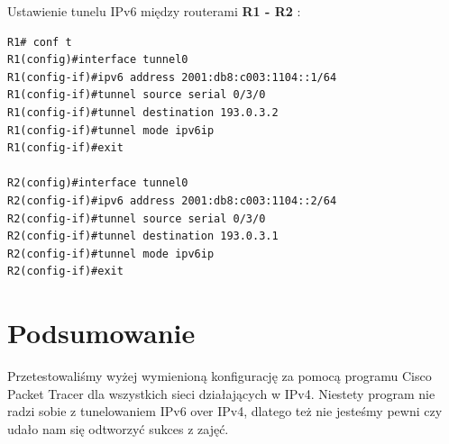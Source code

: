 \documentclass[11pt,a4paper]{article}
\begin{document}
\noindent
Ustawienie tunelu IPv6 między routerami {\bf R1 - R2} :
\begin{lstlisting}
R1# conf t
R1(config)#interface tunnel0	
R1(config-if)#ipv6 address 2001:db8:c003:1104::1/64
R1(config-if)#tunnel source serial 0/3/0
R1(config-if)#tunnel destination 193.0.3.2
R1(config-if)#tunnel mode ipv6ip
R1(config-if)#exit 

R2(config)#interface tunnel0	
R2(config-if)#ipv6 address 2001:db8:c003:1104::2/64
R2(config-if)#tunnel source serial 0/3/0
R2(config-if)#tunnel destination 193.0.3.1
R2(config-if)#tunnel mode ipv6ip
R2(config-if)#exit 

\end{lstlisting}

\section{Podsumowanie}
Przetestowaliśmy wyżej wymienioną konfigurację za pomocą programu Cisco Packet Tracer dla wszystkich sieci działających w IPv4. Niestety program nie radzi sobie z tunelowaniem IPv6 over IPv4, dlatego też nie jesteśmy pewni czy udało nam się odtworzyć sukces z zajęć. 
\end{document}
